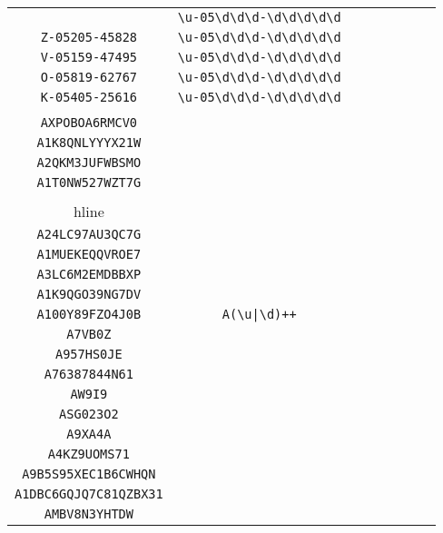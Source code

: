 \begin{longtable}{cccccccc}
\begin{tabular}{ll}
    \verb|B-05492-49430| & \verb|\u-05\d\d\d-\d\d\d\d\d|\\
\verb|Z-05205-45828| & \verb|\u-05\d\d\d-\d\d\d\d\d|\\
\verb|V-05159-47495| & \verb|\u-05\d\d\d-\d\d\d\d\d|\\
\verb|O-05819-62767| & \verb|\u-05\d\d\d-\d\d\d\d\d|\\
\verb|K-05405-25616| & \verb|\u-05\d\d\d-\d\d\d\d\d|
\end{tabular}
\\\midrule 
\begin{tabular}{l}
    \verb|A1XB03X4J35ATE|\\
\verb|AXPOBOA6RMCV0|\\
\verb|A1K8QNLYYYX21W|\\
\verb|A2QKM3JUFWBSMO|\\
\verb|A1T0NW527WZT7G|\\
\\hline\\
\verb|A24LC97AU3QC7G|\\
\verb|A1MUEKEQQVROE7|\\
\verb|A3LC6M2EMDBBXP|\\
\verb|A1K9QGO39NG7DV|\\
\verb|A100Y89FZO4J0B|
\end{tabular}

&
\verb.A(\u|\d)++.
&

\begin{tabular}{l}
    \verb|A((\d)*\d(\u)*\d)*(\u)*(\d)*\d(\u)*\d(\u)*|\\
\verb|A7VB0Z|\\
\verb|A957HS0JE|\\
\verb|A76387844N61|\\
\verb|AW9I9|\\
\verb|ASG023O2|
\end{tabular}

&

\begin{tabular}{l}
    \verb|A((\d)*\u\u\u)*\d(\u)*\d((\u)*\d(\u)*\d)*(\u)*|\\
\verb|A9XA4A|\\
\verb|A4KZ9UOMS71|\\
\verb|A9B5S95XEC1B6CWHQN|\\
\verb|A1DBC6GQJQ7C81QZBX31|\\
\verb|AMBV8N3YHTDW|
\end{tabular}

&


\end{longtable}
